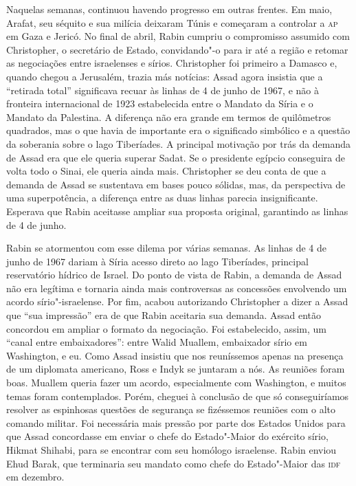 Naquelas semanas, continuou havendo progresso em outras frentes. Em
maio, Arafat, seu séquito e sua milícia deixaram Túnis e começaram a
controlar a \textsc{ap} em Gaza e Jericó. No final de abril, Rabin cumpriu o
compromisso assumido com Christopher, o secretário de Estado,
convidando"-o para ir até a região e retomar as negociações entre
israelenses e sírios. Christopher foi primeiro a Damasco e, quando chegou
a Jerusalém, trazia más notícias: Assad agora insistia que a ``retirada
total'' significava recuar às linhas de 4 de junho de 1967, e não à
fronteira internacional de 1923 estabelecida entre o Mandato da Síria e
o Mandato da Palestina. A diferença não era grande em termos de
quilômetros quadrados, mas o que havia de importante era o significado
simbólico e a questão da soberania sobre o lago Tiberíades. A principal
motivação por trás da demanda de Assad era que ele queria superar Sadat.
Se o presidente egípcio conseguira de volta todo o Sinai, ele queria
ainda mais. Christopher se deu conta de que a demanda de Assad se
sustentava em bases pouco sólidas, mas, da perspectiva de uma
superpotência, a diferença entre as duas linhas parecia insignificante.
Esperava que Rabin aceitasse ampliar sua proposta original, garantindo
as linhas de 4 de junho.

Rabin se atormentou com esse dilema por várias semanas. As linhas de 4
de junho de 1967 dariam à Síria acesso direto ao lago Tiberíades,
principal reservatório hídrico de Israel. Do ponto de vista de Rabin, a
demanda de Assad não era legítima e tornaria ainda mais controversas as
concessões envolvendo um acordo sírio"-israelense. Por fim, acabou
autorizando Christopher a dizer a Assad que ``sua impressão'' era de que
Rabin aceitaria sua demanda. Assad então concordou em ampliar o formato
da negociação. Foi estabelecido, assim, um ``canal entre embaixadores'':
entre Walid Muallem, embaixador sírio em Washington, e eu. Como Assad
insistiu que nos reuníssemos apenas na presença de um diplomata
americano, Ross e Indyk se juntaram a nós. As reuniões foram boas.
Muallem queria fazer um acordo, especialmente com Washington, e muitos
temas foram contemplados. Porém, cheguei à conclusão de que só
conseguiríamos resolver as espinhosas questões de segurança se
fizéssemos reuniões com o alto comando militar. Foi necessária mais
pressão por parte dos Estados Unidos para que Assad concordasse em enviar
o chefe do Estado"-Maior do exército sírio, Hikmat Shihabi, para se
encontrar com seu homólogo israelense. Rabin enviou Ehud Barak, que
terminaria seu mandato como chefe do Estado"-Maior das \textsc{idf} em dezembro.


